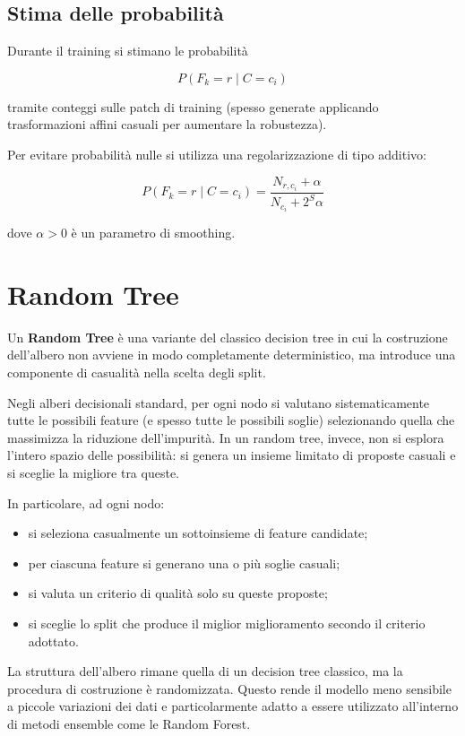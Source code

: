 \subsection{Stima delle probabilità}

Durante il training si stimano le probabilità

\[
P(F_k = r \mid C=c_i)
\]

tramite conteggi sulle patch di training (spesso generate applicando trasformazioni affini casuali per aumentare la robustezza).

Per evitare probabilità nulle si utilizza una regolarizzazione di tipo additivo:

\[
P(F_k = r \mid C=c_i)
=
\frac{N_{r,c_i} + \alpha}
     {N_{c_i} + 2^S \alpha}
\]

dove $\alpha > 0$ è un parametro di smoothing.

\section{Random Tree}

Un \textbf{Random Tree} è una variante del classico decision tree in cui la costruzione dell’albero non avviene in modo completamente deterministico, ma introduce una componente di casualità nella scelta degli split. 

Negli alberi decisionali standard, per ogni nodo si valutano sistematicamente tutte le possibili feature (e spesso tutte le possibili soglie) selezionando quella che massimizza la riduzione dell’impurità. In un random tree, invece, non si esplora l’intero spazio delle possibilità: si genera un insieme limitato di proposte casuali e si sceglie la migliore tra queste.

In particolare, ad ogni nodo:
\begin{itemize}
    \item si seleziona casualmente un sottoinsieme di feature candidate;
    \item per ciascuna feature si generano una o più soglie casuali;
    \item si valuta un criterio di qualità solo su queste proposte;
    \item si sceglie lo split che produce il miglior miglioramento secondo il criterio adottato.
\end{itemize}

La struttura dell’albero rimane quella di un decision tree classico, ma la procedura di costruzione è randomizzata. Questo rende il modello meno sensibile a piccole variazioni dei dati e particolarmente adatto a essere utilizzato all’interno di metodi ensemble come le Random Forest.

